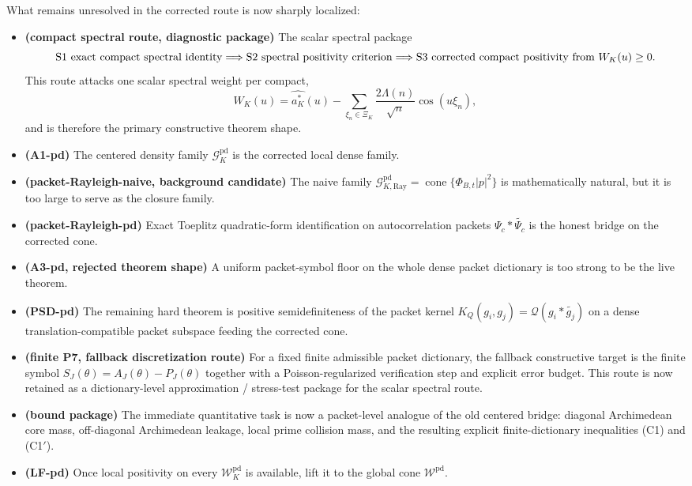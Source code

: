 What remains unresolved in the corrected route is now sharply localized:
\begin{itemize}
  \item \textbf{(compact spectral route, diagnostic package)} The scalar spectral package
  \[
    \textup{S1 exact compact spectral identity}
    \Longrightarrow
    \textup{S2 spectral positivity criterion}
    \Longrightarrow
    \textup{S3 corrected compact positivity from }W_K(u)\ge0.
  \]
  This route attacks one scalar spectral weight per compact,
  \[
    W_K(u)=\widehat{a_K^*}(u)-\sum_{\xi_n\in\Xi_K}\frac{2\Lambda(n)}{\sqrt n}\cos(u\xi_n),
  \]
  and is therefore the primary constructive theorem shape.
  \item \textbf{(A1-pd)} The centered density family $\mathcal G_K^{\mathrm{pd}}$ is the corrected local dense family.
  \item \textbf{(packet-Rayleigh-naive, background candidate)} The naive family $\mathcal G_{K,\mathrm{Ray}}^{\mathrm{pd}}=\operatorname{cone}\{\Phi_{B,t}|p|^2\}$ is mathematically natural, but it is too large to serve as the closure family.
  \item \textbf{(packet-Rayleigh-pd)} Exact Toeplitz quadratic-form identification on autocorrelation packets $\Psi_c * \widetilde{\Psi_c}$ is the honest bridge on the corrected cone.
  \item \textbf{(A3-pd, rejected theorem shape)} A uniform packet-symbol floor on the whole dense packet dictionary is too strong to be the live theorem.
  \item \textbf{(PSD-pd)} The remaining hard theorem is positive semidefiniteness of the packet kernel
  $K_Q(g_i,g_j)=\mathcal Q(g_i * \widetilde{g_j})$ on a dense
  translation-compatible packet subspace feeding the corrected cone.
  \item \textbf{(finite P7, fallback discretization route)} For a fixed finite admissible packet dictionary, the fallback constructive target is the finite symbol
  $S_J(\theta)=A_J(\theta)-P_J(\theta)$ together with a Poisson-regularized
  verification step and explicit error budget. This route is now retained as a dictionary-level approximation / stress-test package for the scalar spectral route.
  \item \textbf{(bound package)} The immediate quantitative task is now a packet-level analogue of the old centered bridge:
  diagonal Archimedean core mass, off-diagonal Archimedean leakage, local prime
  collision mass, and the resulting explicit finite-dictionary inequalities
  \textup{(C1)} and \textup{(C1$'$)}.
  \item \textbf{(LF-pd)} Once local positivity on every $\mathcal W_K^{\mathrm{pd}}$ is available, lift it to the global cone $\mathcal W^{\mathrm{pd}}$.
\end{itemize}

